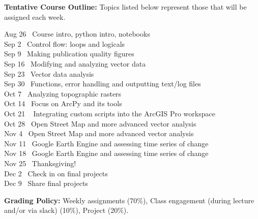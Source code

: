 \documentclass[11pt, a4paper]{article}
\begin{document}
\vspace*{.15in}

\noindent \textbf{Tentative Course Outline:}
Topics listed below represent those that will be assigned each week.
\begin{center} 
\begin{minipage}{5in}
\begin{flushleft}

Aug 26 \dotfill ~Course intro, python intro, notebooks \\
Sep 2 \dotfill ~Control flow: loops and logicals \\
Sep 9 \dotfill ~Making publication quality figures \\
Sep 16 \dotfill ~Modifying and analyzing vector data \\
Sep 23 \dotfill ~Vector data analysis \\
Sep 30 \dotfill ~Functions, error handling and outputting text/log files\\
Oct 7 \dotfill ~Analyzing topographic rasters \\
Oct 14 \dotfill ~Focus on ArcPy and its tools \\
Oct 21 \dotfill ~ Integrating custom scripts into the ArcGIS Pro workspace\\
Oct 28 \dotfill ~Open Street Map and more advanced vector analysis \\
Nov 4 \dotfill ~Open Street Map and more advanced vector analysis \\
Nov 11 \dotfill ~Google Earth Engine and assessing time series of change \\
Nov 18 \dotfill ~Google Earth Engine and assessing time series of change \\
Nov 25 \dotfill ~Thanksgiving! \\
Dec 2 \dotfill ~Check in on final projects \\
Dec 9 \dotfill ~Share final projects \\


\end{flushleft}
\end{minipage}
\end{center}

\vspace*{.15in}
\noindent\textbf{Grading Policy:} Weekly assignments (70\%),  Class engagement (during lecture and/or via slack) (10\%), Project (20\%). %
\end{document}
